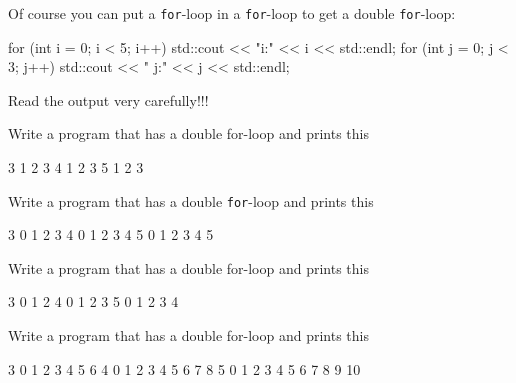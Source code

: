 Of course you can put a \texttt{for}-loop in a \texttt{for}-loop to get a double \texttt{for}-loop:
\begin{console}
for (int i = 0; i < 5; i++)
{   
    std::cout << "i:" << i << std::endl;
    for (int j = 0; j < 3; j++)
    {   
        std::cout << " j:" << j << std::endl;
    }
}
\end{console}
Read the output very carefully!!!

\begin{ex}
Write a program that has a double for-loop and prints
this
\begin{console}
3
  1 2 3
4
  1 2 3
5
  1 2 3 
\end{console}
\end{ex}

\begin{ex}
Write a program that has a double \texttt{for}-loop and prints this
\begin{console}
3
  0 1 2 3
4
  0 1 2 3 4
5
  0 1 2 3 4 5
\end{console}
\end{ex}

\begin{ex} Write a program that has a double for-loop and prints
this
\begin{console}
3
  0 1 2
4
  0 1 2 3
5
  0 1 2 3 4
\end{console}
\end{ex}
\begin{ex}
Write a program that has a double for-loop and prints this
\begin{console}
3
  0 1 2 3 4 5 6
4
  0 1 2 3 4 5 6 7 8
5
  0 1 2 3 4 5 6 7 8 9 10
\end{console}
\end{ex}

